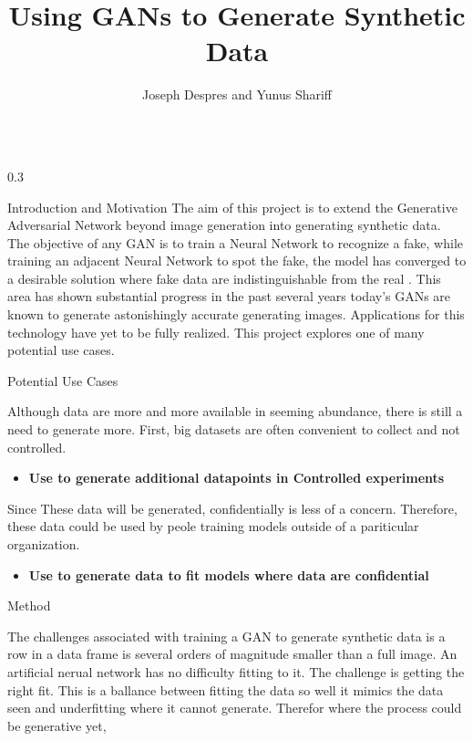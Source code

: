 \documentclass{msuposter}
\title{Using GANs to Generate Synthetic Data}
\author{Joseph Despres and Yunus Shariff}
\institute{Michigan State University}
\newcommand{\colwidth}{0.3\linewidth}
\begin{document}
\begin{frame}{}
\begin{columns}[t]

\begin{column}{\colwidth}

\begin{block}{Introduction and Motivation}
The aim of this project is to extend the Generative Adversarial Network beyond image generation into generating synthetic data. The objective of any GAN is to train a Neural Network to recognize a fake, while training an adjacent Neural Network to spot the fake, the model has converged to a desirable solution where fake data are indistinguishable from the real \cite{NIPS2014_5ca3e9b1}.  This area has shown substantial progress in the past several years today's GANs are known to generate astonishingly accurate generating images. Applications for this technology have yet to be fully realized. This project explores one of many potential use cases.

\end{block}

\begin{block}{Potential Use Cases}

Although data are more and more available in seeming abundance, there is still a need to generate more. First, big datasets are often convenient to collect and not controlled.

\begin{itemize}
	\item \textbf{Use to generate additional datapoints in Controlled experiments}
\end{itemize}

Since These data will be generated, confidentially is less of a concern. Therefore, these data could be used by peole training models outside of a pariticular organization.

\begin{itemize}
	\item \textbf{Use to generate data to fit models where data are confidential}
	
\end{itemize}

\end{block}

\begin{block}{Method}

The challenges associated with training a GAN to generate synthetic data is a row in a data frame is several orders of magnitude smaller than a full image. An artificial nerual network has no difficulty fitting to it. The challenge is getting the right fit. This is a ballance between fitting the data so well it mimics the data seen and underfitting where it cannot generate. Therefor  where the process could be generative yet, 


\end{block}
\end{column}
\end{columns}
\end{frame}
\end{document}
